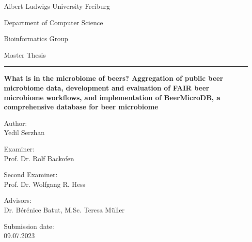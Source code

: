 \begin{titlepage}
 \centering
 Albert-Ludwigs University Freiburg
 
 Department of Computer Science
 
 Bioinformatics Group
 \vspace{4cm}
 
  Master Thesis
 \vspace{3mm} 
  
 \huge \hrule \vspace{5mm}
 \textbf{What is in the microbiome of beers? Aggregation of public beer microbiome data, development and evaluation of FAIR beer microbiome workflows, and implementation of BeerMicroDB, a comprehensive database for beer microbiome}
 
 \hrulefill
 
 \vfill
 \raggedright
 \normalsize
  Author:\\
  Yedil Serzhan 
  
  Examiner:\\
  Prof. Dr. Rolf Backofen
  
  Second Examiner:\\
  Prof. Dr. Wolfgang R. Hess
  
  Advisors:\\
  Dr. Bérénice Batut, M.Sc. Teresa Müller
  
  Submission date:\\
  09.07.2023

\end{titlepage}